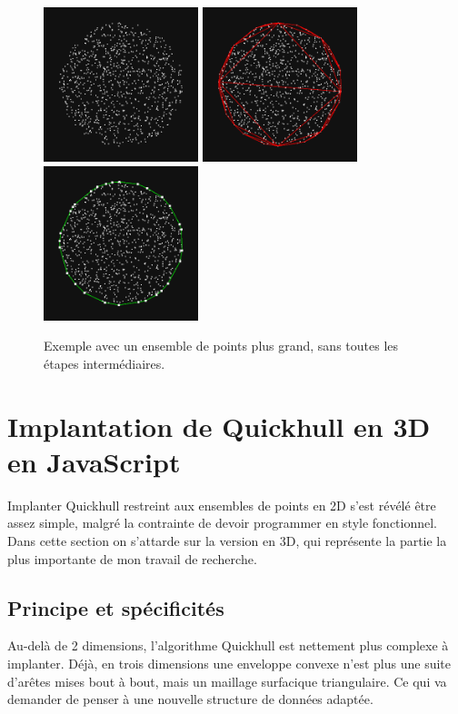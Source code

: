 \documentclass[]{article}
\begin{document}
\begin{figure}[H]
	\begin{center}
		\includegraphics[width=4.5cm]{qh2d/demo2d/frame_b0.png}
		\includegraphics[width=4.5cm]{qh2d/demo2d/frame_b1.png}
		\includegraphics[width=4.5cm]{qh2d/demo2d/frame_b2.png}
	\end{center}
	\caption{Exemple avec un ensemble de points plus grand, sans toutes les étapes intermédiaires.}
\end{figure}

\pagebreak
\section{Implantation de Quickhull en 3D en JavaScript}
Implanter Quickhull restreint aux ensembles de points en 2D s'est révélé être assez simple, malgré la contrainte de devoir programmer en style fonctionnel. Dans cette section on s'attarde sur la version en 3D, qui représente la partie la plus importante de mon travail de recherche.

\subsection{Principe et spécificités}
Au-delà de 2 dimensions, l'algorithme Quickhull est nettement plus complexe à implanter. Déjà, en trois dimensions une enveloppe convexe n'est plus une suite d'arêtes mises bout à bout, mais un maillage surfacique triangulaire. Ce qui va demander de penser à une nouvelle structure de données adaptée.
\end{document}
